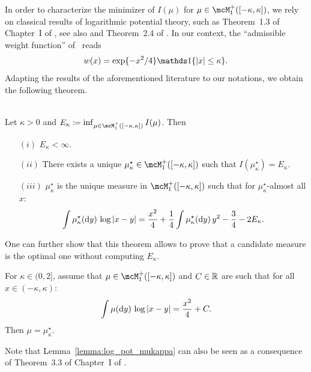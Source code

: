 { \myskip 
In order to characterize the minimizer of $I(\mu)$ for $\mu \in \mcM_1^+([-\kappa,\kappa])$, we
rely on classical results of logarithmic potential theory, such as Theorem~1.3 of Chapter~I of \cite{saff2013logarithmic}, see also \cite{mhaskar1985does} and Theorem~2.4 of \cite{arous1997large}.
In our context, the ``admissible weight function'' of~\cite{saff2013logarithmic} reads
\begin{equation*}
    w(x) = \exp\{-x^2/4\} \indi\{|x| \leq \kappa\}.
\end{equation*}
Adapting the results of the aforementioned literature to our notations, we obtain the following theorem.
\begin{theorem}
    \label{thm:properties_inf_I}
    ~\\
    Let $\kappa > 0$ and
    $E_\kappa \coloneqq \inf_{\mu \in \mcM_1^+([-\kappa,\kappa])} I(\mu)$. Then
    \begin{itemize}
        \item[$(i)$] $E_\kappa < \infty$.
        \item[$(ii)$] There exists a unique $\mu_\kappa^\star \in \mcM_1^+([-\kappa,\kappa])$ such that $I(\mu_\kappa^\star) = E_\kappa$.
        \item[$(iii)$] $\mu_\kappa^\star$ is the unique measure in $\mcM_1^+([-\kappa,\kappa])$ such that for $\mu_\kappa^\star$-almost all $x$: 
        \begin{equation*}
            \int \mu_\kappa^\star(\mathrm{d} y) \, \log |x - y| = \frac{x^2}{4} + \frac{1}{4} \int \mu_\kappa^\star(\mathrm{d} y) \, y^2 - \frac{3}{4} - 2 E_\kappa.
        \end{equation*}
    \end{itemize} 
\end{theorem}
\noindent
One can further show that this theorem allows to prove that a candidate measure is the optimal one without computing $E_\kappa$.
\begin{lemma}\label{lemma:log_pot_mukappa}
    For $\kappa \in (0,2]$, assume that $\mu \in \mcM_1^+([-\kappa,\kappa])$ and $C \in \mathbb{R}$ are such that for all $x \in (-\kappa,\kappa)$:
    \begin{equation}\label{eq:log_pot_mukappa_hyp}
        \int \mu(\mathrm{d} y) \, \log |x - y| = \frac{x^2}{4} + C.
    \end{equation}
    Then $\mu = \mu_\kappa^\star$.
\end{lemma}
\noindent
Note that Lemma~\ref{lemma:log_pot_mukappa} can also be seen as a consequence of Theorem~3.3 of Chapter~I of \cite{saff2013logarithmic}. 
}
